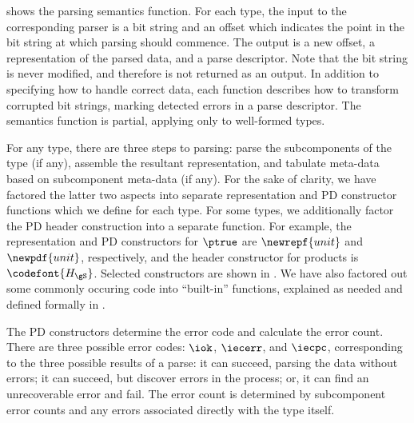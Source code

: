  shows the parsing semantics function.  For each
type, the input to the corresponding parser is a bit string and an
offset which indicates the point in the bit string at which parsing
should commence.  The output is a new offset, a representation of the
parsed data, and a parse descriptor. Note that the bit string is
never modified, and therefore is not returned as an output.  In addition
to specifying how to handle correct data, each function describes how
to transform corrupted bit strings, marking detected errors in
a parse descriptor. The semantics function is partial, applying only
to well-formed \ddc{} types.

For any type, there are three steps to parsing: parse the
subcomponents of the type (if any), assemble the resultant representation, and
tabulate meta-data based on subcomponent meta-data
(if any). For the sake of clarity, we have factored the latter two
aspects into separate representation and PD constructor functions which we define for
each type. For some types, we additionally factor the PD header
construction into a separate function. For example, the representation 
and PD constructors for $\ptrue$ are $\newrepf {unit}$ and $\newpdf
{unit}$, respectively, and the header constructor for products is
${\codefont{H_{\gS}}}$. Selected constructors are shown in
. We have also factored out some commonly
occuring code into ``built-in'' functions, explained as needed and
defined formally in .

The PD constructors determine the error code and
calculate the error count.  There are three possible error codes:
$\iok$, $\iecerr$, and $\iecpc$, corresponding to the three possible results of a parse: 
it can succeed, parsing the data without errors; it can succeed,
but discover errors in the process; or, it can find an
unrecoverable error and fail.
The error count is determined by subcomponent error counts and any errors associated directly with the type
itself.  

